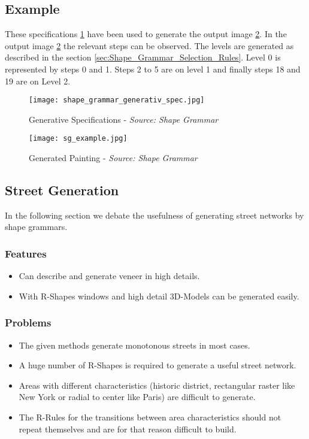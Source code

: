 \subsection{Example}
These specifications \ref{fig:shape_grammar_gen_specifications} have been used to generate the output image \ref{fig:Shape Grammars/Example}. In the output image \ref{fig:Shape Grammars/Example} the relevant steps can be observed. The levels are generated as described in the section \ref{sec:Shape_Grammar_Selection_Rules}. Level 0 is represented by steps 0 and 1. Steps 2 to 5 are on level 1 and finally steps 18 and 19 are on Level 2.
\begin{figure}[!ht]
    \centering
    \texttt{[image: shape\_grammar\_generativ\_spec.jpg]}
    \caption{Generative Specifications - \textit{Source: Shape Grammar} \citep{shapeGrammars:1972}}
    \label{fig:shape_grammar_gen_specifications}
\end{figure}

\begin{figure}[!ht]
    \centering
    \texttt{[image: sg\_example.jpg]}
    \caption{ Generated Painting - \textit{Source: Shape Grammar} \citep{shapeGrammars:1972}}
    \label{fig:Shape Grammars/Example}
\end{figure}

\FloatBarrier
\pagebreak
\subsection{Street Generation}
In the following section we debate the usefulness of generating street networks by shape grammars.
\subsubsection{Features}
\begin{itemize}
    \item Can describe and generate veneer in high details.
    \item With R-Shapes windows and high detail 3D-Models can be generated easily.
\end{itemize}

\subsubsection{Problems}
\begin{itemize}
    \item The given methods generate monotonous streets in most cases. 
    \item A huge number of R-Shapes is required to generate a useful street network.
    \item Areas with different characteristics (historic district, rectangular raster like New York or radial to center like Paris) are difficult to generate.
    \item The R-Rules for the transitions between area characteristics should not repeat themselves and are for that reason difficult to build.
\end{itemize}

